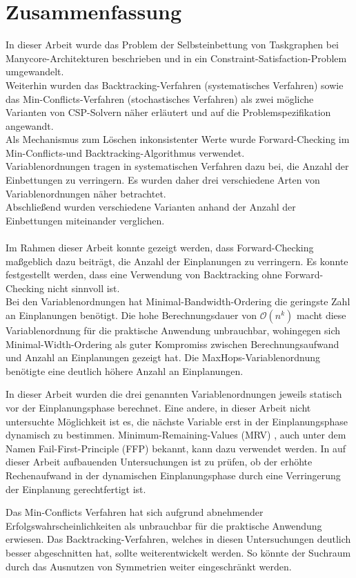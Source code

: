 \chapter{Zusammenfassung}\label{zusammenfassung}

In dieser Arbeit wurde das Problem der Selbsteinbettung von Taskgraphen bei Manycore-Architekturen beschrieben und in ein Constraint-Satisfaction-Problem umgewandelt. \\ 
Weiterhin wurden das Backtracking-Verfahren (systematisches Verfahren) sowie das Min-Conflicts-Verfahren (stochastisches Verfahren) als zwei mögliche Varianten von CSP-Solvern näher erläutert und auf die Problemspezifikation angewandt. \\
Als Mechanismus zum Löschen inkonsistenter Werte wurde Forward-Checking im Min-Conflicts-und Backtracking-Algorithmus verwendet. \\
Variablenordnungen tragen in systematischen Verfahren dazu bei, die Anzahl der Einbettungen zu verringern. Es wurden daher drei verschiedene Arten von Variablenordnungen näher betrachtet. \\
Abschließend wurden verschiedene Varianten anhand der Anzahl der Einbettungen miteinander verglichen. \\ 
\\
Im Rahmen dieser Arbeit konnte gezeigt werden, dass Forward-Checking maßgeblich dazu beiträgt, die Anzahl der Einplanungen zu verringern. 
Es konnte festgestellt werden, dass eine Verwendung von Backtracking ohne Forward-Checking nicht sinnvoll ist.\\
Bei den Variablenordnungen hat Minimal-Bandwidth-Ordering die geringste Zahl an Einplanungen benötigt. Die hohe Berechnungsdauer von $\mathcal O(n^k)$ macht diese Variablenordnung für die praktische Anwendung unbrauchbar, wohingegen sich Minimal-Width-Ordering als guter Kompromiss zwischen Berechnungsaufwand und Anzahl an Einplanungen gezeigt hat. Die MaxHops-Variablenordnung benötigte eine deutlich höhere Anzahl an Einplanungen.

In dieser Arbeit wurden die drei genannten Variablenordnungen jeweils statisch vor der Einplanungsphase berechnet. Eine andere, in dieser Arbeit nicht untersuchte Möglichkeit ist es, die nächste Variable erst in der Einplanungsphase dynamisch zu bestimmen. Minimum-Remaining-Values (MRV) \cite{artificialIntelligence},  auch unter dem Namen Fail-First-Principle (FFP) \cite{foundationCSP} bekannt, kann dazu verwendet werden. In auf dieser Arbeit aufbauenden Untersuchungen ist zu prüfen, ob der erhöhte Rechenaufwand in der dynamischen Einplanungsphase durch eine Verringerung der Einplanung gerechtfertigt ist. 

Das Min-Conflicts Verfahren hat sich aufgrund abnehmender Erfolgswahrscheinlichkeiten als unbrauchbar für die praktische Anwendung erwiesen. Das Backtracking-Verfahren, welches in diesen Untersuchungen deutlich besser abgeschnitten hat, sollte weiterentwickelt werden. So könnte der Suchraum durch das Ausnutzen von Symmetrien\cite{Symmetrie} weiter eingeschränkt werden. 


